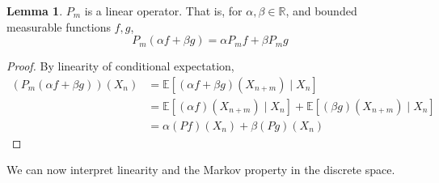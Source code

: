 \documentclass{article}
\theoremstyle{definition}
\newtheorem{lemma}[theorem]{Lemma}
\theoremstyle{remark}
\theoremstyle{definition}
\begin{document}
\begin{lemma}
$P_m$ is a linear operator. That is, for $\alpha, \beta \in \mathbb{R}$, and bounded measurable functions $f, g$, 
\[P_m (\alpha f + \beta g) = \alpha P_m f + \beta P_m g\] 
\end{lemma}
\begin{proof}
By linearity of conditional expectation, 
\begin{align*}
    (P_m (\alpha f + \beta g))(X_n) & = \mathbb{E}[(\alpha f + \beta g)(X_{n+m}) \mid X_n] \\
    & = \mathbb{E}[(\alpha f) (X_{n + m}) \mid X_n] + \mathbb{E}[(\beta g) (X_{n+m}) \mid X_n] \\
    & = \alpha (P f) (X_n) + \beta (P g) (X_n)
\end{align*}
\end{proof}

We can now interpret linearity and the Markov property in the discrete space. 
\end{document}
